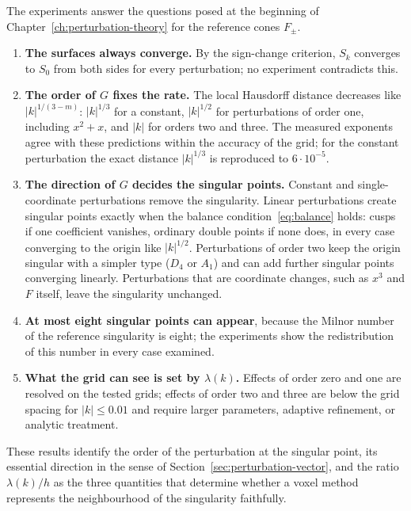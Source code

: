 \documentclass[12pt, a4paper, oneside]{book}
\theoremstyle{plain}
\theoremstyle{definition}
\theoremstyle{remark}
\begin{document}
The experiments answer the questions posed at the beginning of
Chapter~\ref{ch:perturbation-theory} for the reference cones $F_\pm$.
\begin{enumerate}
    \item \textbf{The surfaces always converge.} By the sign-change criterion,
          $S_k$ converges to $S_0$ from both sides for every perturbation; no
          experiment contradicts this.
    \item \textbf{The order of $G$ fixes the rate.} The local Hausdorff distance
          decreases like $|k|^{1/(3-m)}$: $|k|^{1/3}$ for a constant,
          $|k|^{1/2}$ for perturbations of order one, including $x^2+x$, and
          $|k|$ for orders two and three. The measured exponents agree with
          these predictions within the accuracy of the grid; for the constant
          perturbation the exact distance $|k|^{1/3}$ is reproduced to
          $6\cdot10^{-5}$.
    \item \textbf{The direction of $G$ decides the singular points.} Constant
          and single-coordinate perturbations remove the singularity. Linear
          perturbations create singular points exactly when the balance
          condition~\eqref{eq:balance} holds: cusps if one coefficient
          vanishes, ordinary double points if none does, in every case
          converging to the origin like $|k|^{1/2}$. Perturbations of order two
          keep the origin singular with a simpler type ($D_4$ or $A_1$) and can
          add further singular points converging linearly. Perturbations that
          are coordinate changes, such as $x^3$ and $F$ itself, leave the
          singularity unchanged.
    \item \textbf{At most eight singular points can appear}, because the Milnor
          number of the reference singularity is eight; the experiments show
          the redistribution of this number in every case examined.
    \item \textbf{What the grid can see is set by $\lambda(k)$.} Effects of
          order zero and one are resolved on the tested grids; effects of order
          two and three are below the grid spacing for $|k|\le0.01$ and require
          larger parameters, adaptive refinement, or analytic treatment.
\end{enumerate}
These results identify the order of the perturbation at the singular point,
its essential direction in the sense of
Section~\ref{sec:perturbation-vector}, and the ratio $\lambda(k)/h$ as the three
quantities that determine whether a voxel method represents the neighbourhood
of the singularity faithfully.

\newpage



\end{document}
